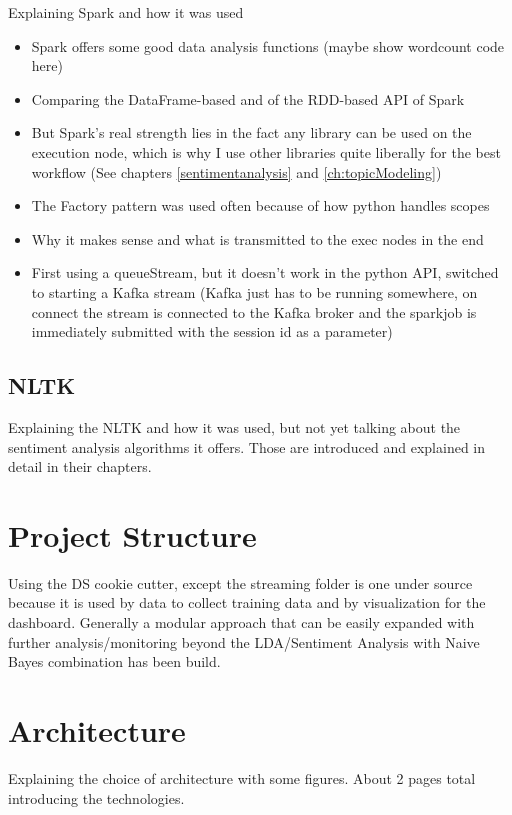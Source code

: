 Explaining Spark and how it was used
\begin{itemize}
    \item
    Spark offers some good data analysis functions (maybe show wordcount code here)
    \item
    Comparing the DataFrame-based and of the RDD-based API of Spark
    \item
    But Spark's real strength lies in the fact any library can be used on the execution node, which is why I use other libraries quite liberally for the best workflow (See chapters \ref{sentimentanalysis} and \ref{ch:topicModeling})
    \item
    The Factory pattern was used often because of how python handles scopes
    \item
    Why it makes sense and what is transmitted to the exec nodes in the end
    \item
    First using a queueStream, but it doesn’t work in the python API, switched to starting a Kafka stream (Kafka just has to be running somewhere, on connect the stream is connected to the Kafka broker and the sparkjob is immediately submitted with the session id as a parameter)
\end{itemize}

\subsection{NLTK}
\label{subsec:nltk}

Explaining the NLTK and how it was used, but not yet talking about the sentiment analysis algorithms it offers.
Those are introduced and explained in detail in their chapters.

\section{Project Structure}
\label{sec:projectStructure}


Using the DS cookie cutter, except the streaming folder is one under source because it is used by data to collect training data and by visualization for the dashboard.
Generally a modular approach that can be easily expanded with further analysis/monitoring beyond the LDA/Sentiment Analysis with Naive Bayes combination has been build.


\section{Architecture}
\label{sec:architecture}

Explaining the choice of architecture with some figures.
About 2 pages total introducing the technologies.

\pagebreak[2]
